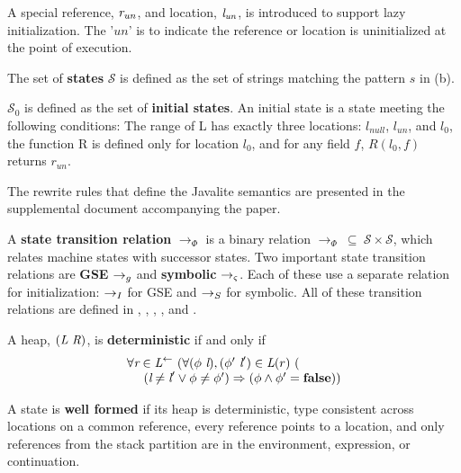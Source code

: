 A special reference, $\emph{r}_\mathit{un}$, and location,
$\emph{l}_\mathit{un}$, is introduced to support lazy
initialization. The '$\mathit{un}$' is to indicate the reference or
location is uninitialized at the point of execution.

\begin{definition}
\label{def:state}
The set of \textbf{states} $\mathcal{S}$ is defined as the set of strings matching the pattern $s$ in (b).
\end{definition}

\begin{definition}
\label{def:initstate}
$\mathcal{S}_0$ is defined as the set of \textbf{initial states}. An
initial state is a state meeting the following conditions: The range
of L has exactly three locations: $l_{null}$, $l_{un}$, and $l_0$, the
function R is defined only for location $l_0$, and for any field $f$,
$R(l_0,f)$ returns $r_{un}$.
\end{definition}

The rewrite rules that define the Javalite semantics are presented in
the supplemental document accompanying the paper.

\begin{definition}
A \textbf{state transition relation} $\rightarrow_{\Phi}$ is a binary
relation $\rightarrow_{\Phi}\ \subseteq\ \mathcal{S} \times
\mathcal{S} $, which relates machine states with successor states. Two
important state transition relations are \textbf{GSE} $\rightarrow_{g}$ and
\textbf{symbolic} $\rightarrow_{\varsigma}$. Each of these use a separate relation for
initialization: $\rightarrow_I$ for GSE and $\rightarrow_S$ for symbolic. All of
these transition relations are defined in ,
, , ,  and .
\end{definition}

\begin{definition}
A heap, $(\emph{L}\ \emph{R})$, is \textbf{deterministic} if and only if 
\[
\begin{array}{l}
\forall \cfgnt{r} \in \cfgnt{L}^\leftarrow\ (\forall (\phi\ \cfgnt{l}),(\phi^\prime\ \cfgnt{l}^\prime) \in \cfgnt{L}(r)\ (\\
\ \ \ \ (\cfgnt{l} \neq \cfgnt{l}^\prime \vee \phi \neq \phi^\prime) \Rightarrow (\phi \wedge \phi^\prime = \cfgt{false}))
\end{array}
\]
\end{definition}

\begin{definition}
A state is \textbf{well formed} if its heap is deterministic, type consistent across locations on a common reference, every reference points to a location, and only references from the stack partition are in the environment, expression, or continuation.
\end{definition}

